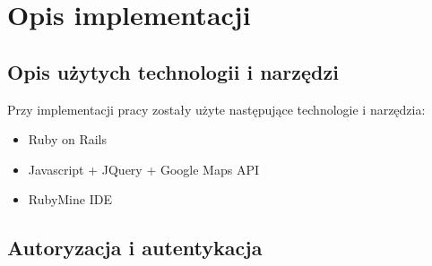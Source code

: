 \chapter{Opis implementacji}
\label{cha:uzywaneTechnologie}

\section{Opis użytych technologii i narzędzi}
\label{sec:technology}
Przy implementacji pracy zostały użyte następujące technologie i narzędzia:
\begin{itemize}
\item Ruby on Rails
\item Javascript + JQuery + Google Maps API
\item RubyMine IDE
\end{itemize}

\section{Autoryzacja i autentykacja}
\label{sec:autoryzacjaAutentykacja}
